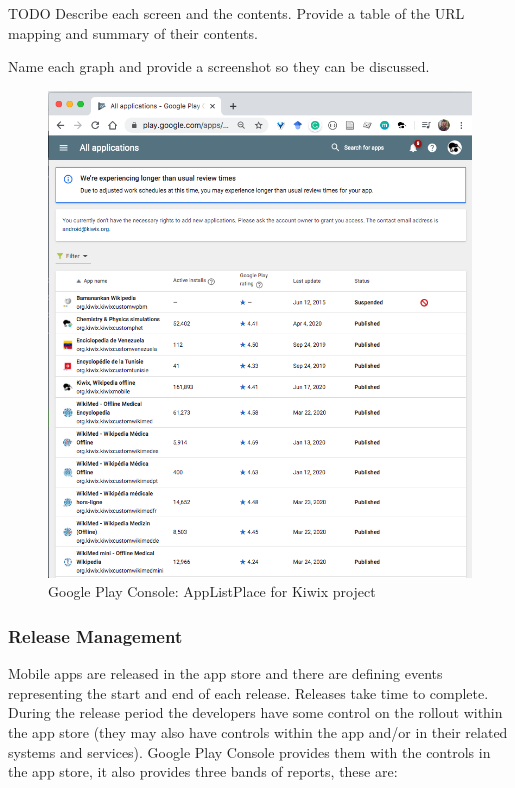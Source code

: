 TODO Describe each screen and the contents. Provide a table of the URL mapping and summary of their contents.

Name each graph and provide a screenshot so they can be discussed.

\begin{figure}[htbp!]
    \centering
    \includegraphics[width=15cm]{images/android-vitals-screenshots/AppListPlace-kiwix-2020-Jun-17.png}
    \caption{Google Play Console: AppListPlace for Kiwix project}
    \label{fig:gpc-applistplace-kiwix}
\end{figure}

\subsubsection{Release Management}
Mobile apps are released in the app store and there are defining events representing the start and end of each release. Releases take time to complete. During the release period the developers have some control on the rollout within the app store (they may also have controls within the app and/or in their related systems and services). Google Play Console provides them with the controls in the app store, it also provides three bands of reports, these are:

